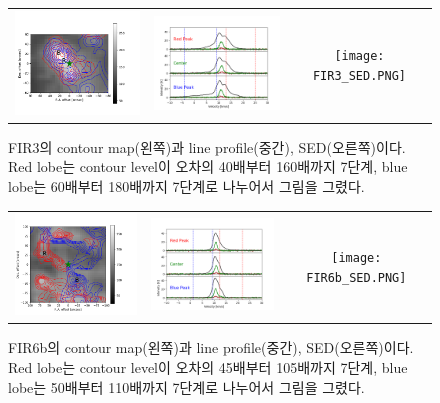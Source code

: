 \begin{figure}[h!]
	\begin{center}
		\begin{tabular}{ccc}
			\includegraphics[width=5cm]{Orion_12CO2-1_FIR3_rbcontour_400_modified.png} &   \includegraphics[width=5cm]{Orion_12CO2-1_FIR3_line_profile_400.png} &
			\texttt{[image: FIR3\_SED.PNG]} \\
		\end{tabular}
		\caption{FIR3의 contour map(왼쪽)과 line profile(중간), SED(오른쪽)이다. Red lobe는 contour level이 오차의 40배부터 160배까지 7단계, blue lobe는 60배부터 180배까지 7단계로 나누어서 그림을 그렸다.}
	\end{center}
\end{figure}

\begin{figure}[h!]
	\begin{center}
		\begin{tabular}{ccc}
			\includegraphics[width=5cm]{Orion_12CO2-1_FIR6b_rbcontour_400_modified.png} &   \includegraphics[width=5cm]{Orion_12CO2-1_FIR6b_line_profile_400.png} &
			\texttt{[image: FIR6b\_SED.PNG]}\\
		\end{tabular}
		\caption{FIR6b의 contour map(왼쪽)과 line profile(중간), SED(오른쪽)이다. Red lobe는 contour level이 오차의 45배부터 105배까지 7단계, blue lobe는 50배부터 110배까지 7단계로 나누어서 그림을 그렸다.}
	\end{center}
\end{figure}

